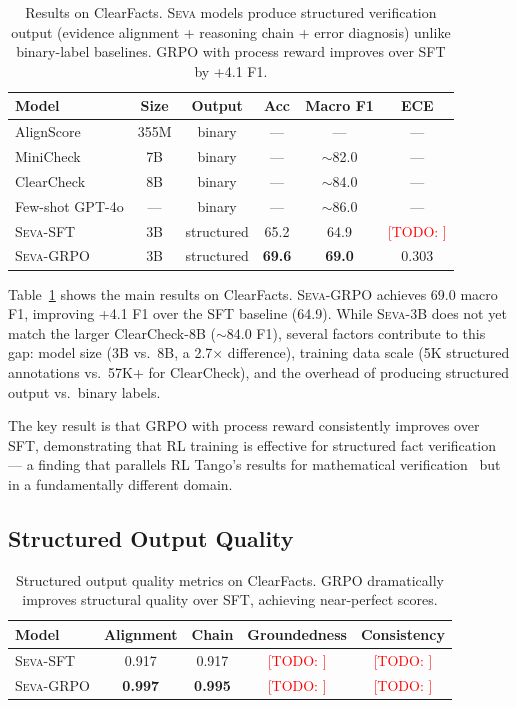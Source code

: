 \documentclass{article}
\newcommand{\seva}{\textsc{Seva}}
\newcommand{\todo}[1]{\textcolor{red}{[TODO: #1]}}
\newcommand{\realnumber}[1]{\textbf{#1}}
\begin{document}
\begin{table}[t]
\centering
\caption{Results on ClearFacts. \seva{} models produce structured verification output (evidence alignment + reasoning chain + error diagnosis) unlike binary-label baselines. GRPO with process reward improves over SFT by +4.1 F1.}
\label{tab:main_results}
\small
\begin{tabular}{lccccc}
\toprule
\textbf{Model} & \textbf{Size} & \textbf{Output} & \textbf{Acc} & \textbf{Macro F1} & \textbf{ECE} \\
\midrule
AlignScore & 355M & binary & --- & --- & --- \\
MiniCheck & 7B & binary & --- & $\sim$82.0 & --- \\
ClearCheck & 8B & binary & --- & $\sim$84.0 & --- \\
Few-shot GPT-4o & --- & binary & --- & $\sim$86.0 & --- \\
\midrule
\seva{}-SFT & 3B & structured & 65.2 & 64.9 & \todo{} \\
\seva{}-GRPO & 3B & structured & \realnumber{69.6} & \realnumber{69.0} & 0.303 \\
\bottomrule
\end{tabular}
\end{table}

Table~\ref{tab:main_results} shows the main results on ClearFacts.
\seva{}-GRPO achieves 69.0 macro F1, improving +4.1 F1 over the SFT baseline (64.9).
While \seva{}-3B does not yet match the larger ClearCheck-8B ($\sim$84.0 F1), several factors contribute to this gap: model size (3B vs.\ 8B, a 2.7$\times$ difference), training data scale (5K structured annotations vs.\ 57K+ for ClearCheck), and the overhead of producing structured output vs.\ binary labels.

The key result is that GRPO with process reward consistently improves over SFT, demonstrating that RL training is effective for structured fact verification --- a finding that parallels RL Tango's results for mathematical verification~\citep{zha2025tango} but in a fundamentally different domain.


\subsection{Structured Output Quality}

\begin{table}[t]
\centering
\caption{Structured output quality metrics on ClearFacts. GRPO dramatically improves structural quality over SFT, achieving near-perfect scores.}
\label{tab:structure_quality}
\small
\begin{tabular}{lcccc}
\toprule
\textbf{Model} & \textbf{Alignment} & \textbf{Chain} & \textbf{Groundedness} & \textbf{Consistency} \\
\midrule
\seva{}-SFT & 0.917 & 0.917 & \todo{} & \todo{} \\
\seva{}-GRPO & \realnumber{0.997} & \realnumber{0.995} & \todo{} & \todo{} \\
\bottomrule
\end{tabular}
\end{table}
\end{document}
